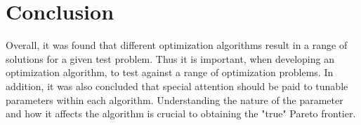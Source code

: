 \documentclass{article}
\begin{document}
%

\section{Conclusion}

Overall, it was found that different optimization algorithms result in a range of solutions for a given test problem. Thus it is important, when developing an optimization algorithm, to test against a range of optimization problems. In addition, it was also concluded that special attention should be paid to tunable parameters within each algorithm. Understanding the nature of the parameter and how it affects the algorithm is crucial to obtaining the "true" Pareto frontier. 


 
\vspace{-0.1in}


 
 
\end{document}
